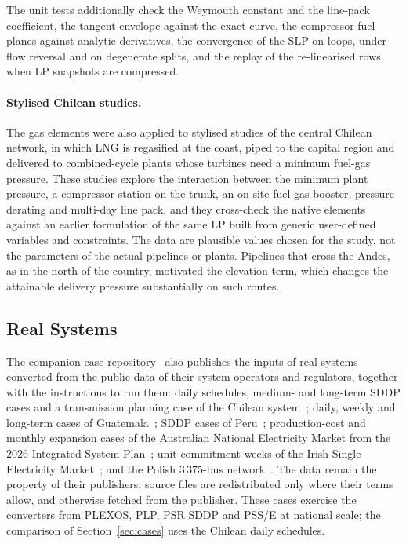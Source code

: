 The unit tests additionally check the Weymouth constant and the
line-pack coefficient, the tangent envelope against the exact curve,
the compressor-fuel planes against analytic derivatives, the
convergence of the SLP on loops, under flow reversal and on degenerate
splits, and the replay of the re-linearised rows when LP snapshots are
compressed.

\paragraph{Stylised Chilean studies.}
The gas elements were also applied to stylised studies of the central
Chilean network, in which LNG is regasified at the coast, piped to the
capital region and delivered to combined-cycle plants whose turbines
need a minimum fuel-gas pressure.  These studies explore the interaction
between the minimum plant pressure, a compressor station on the trunk,
an on-site fuel-gas booster, pressure derating and multi-day line pack,
and they cross-check the native elements against an earlier formulation
of the same LP built from generic user-defined variables and
constraints.  The data are plausible values chosen for the study, not
the parameters of the actual pipelines or plants.  Pipelines that cross
the Andes, as in the north of the country, motivated the elevation
term, which changes the attainable delivery pressure substantially on
such routes.

\subsection{Real Systems}
\label{sec:real_systems}

The companion case repository~\cite{gtoptcases} also publishes the
inputs of real systems converted from the public data of their system
operators and regulators, together with the instructions to run them:
daily schedules, medium- and long-term SDDP cases and a transmission
planning case of the Chilean system~\cite{cen_pcp}; daily, weekly and
long-term cases of Guatemala~\cite{amm_eor}; SDDP cases of
Peru~\cite{coes_mrfo}; production-cost and monthly expansion cases of
the Australian National Electricity Market from the 2026 Integrated
System Plan~\cite{aemo2026isp}; unit-commitment weeks of the Irish
Single Electricity Market~\cite{sem2025plexos}; and the Polish
3\,375-bus network~\cite{zimmerman2011matpower}.  The data remain the
property of their publishers; source files are redistributed only where
their terms allow, and otherwise fetched from the publisher.  These
cases exercise the converters from PLEXOS, PLP, PSR SDDP and PSS/E at
national scale; the comparison of Section~\ref{sec:cases} uses the
Chilean daily schedules.

